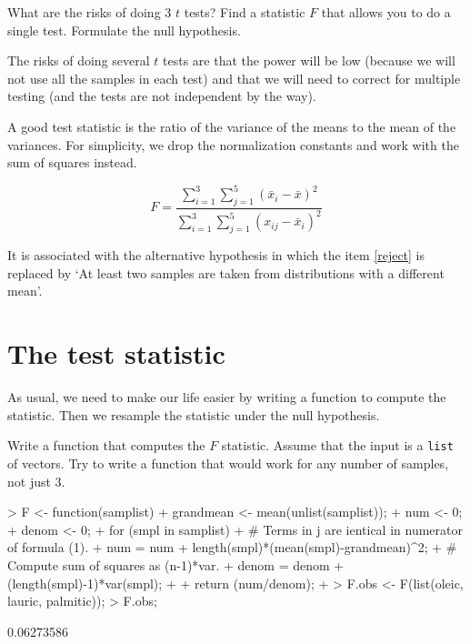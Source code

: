 \documentclass[a4paper]{article}
\theoremstyle{definition}
\begin{document}
\begin{Exercise}
What are the risks of doing 3 $t$ tests? Find a statistic $F$ that allows
you to do a single test. Formulate the null hypothesis.
\end{Exercise}
\begin{Answer}
The risks of doing several $t$ tests are that the power will be low
(because we will not use all the samples in each test) and that we
will need to correct for multiple testing (and the tests
are not independent by the way).

A good test statistic is the ratio of the variance of the means to the
mean of the variances. For simplicity, we drop the normalization constants
and work with the sum of squares instead.

\begin{equation}
F = \frac{\sum_{i=1}^3 \sum_{j=1}^5 (\bar{x}_i - \bar{x})^2}
  {\sum_{i=1}^3 \sum_{j=1}^5 (x_{ij} - \bar{x}_i)^2}
\end{equation}

It is associated with the alternative hypothesis
in which the item \ref{reject} is replaced by `At least two samples
are taken from distributions with a different mean'.
\end{Answer}


\section{The test statistic}

As usual, we need to make our life easier by writing a function to
compute the statistic. Then we resample the statistic under the
null hypothesis.

\begin{Exercise}
Write a function that computes the $F$ statistic. Assume that the
input is a \texttt{list} of vectors. Try to write a function that would
work for any number of samples, not just 3.
\end{Exercise}
\begin{Answer}
\begin{Schunk}
\begin{Sinput}
> F <- function(samplist) {
+   grandmean <- mean(unlist(samplist));
+   num <- 0;
+   denom <- 0;
+   for (smpl in samplist) {
+     # Terms in j are ientical in numerator of formula (1).
+     num = num + length(smpl)*(mean(smpl)-grandmean)^2;
+     # Compute sum of squares as (n-1)*var.
+     denom = denom + (length(smpl)-1)*var(smpl);
+   }
+   return (num/denom);
+ }
> F.obs <- F(list(oleic, lauric, palmitic));
> F.obs;
\end{Sinput}
\begin{Soutput}
[1] 0.06273586
\end{Soutput}
\end{Schunk}
\end{Answer}
\end{document}
